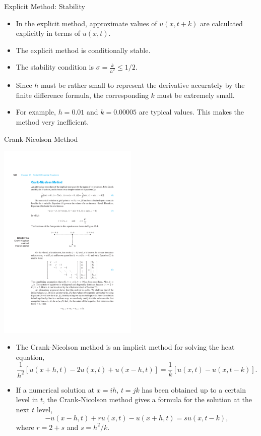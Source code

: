 \documentclass{beamer}
\begin{document}
\begin{frame}{Explicit Method: Stability}
    \begin{itemize}
        \item In the explicit method, approximate values
        of $u(x, t +k)$ are calculated explicitly in terms of $u(x, t)$.
        \item The explicit method is conditionally stable.
        \item The stability condition is $\sigma =\frac{k}{h^2}\leq 1/2$.
        \item Since $h$ must be rather small to represent the derivative accurately by the finite difference
        formula, the corresponding $k$ must be extremely small.
        \item For example, $h=0.01$ and $k=0.00005$ are typical values. This makes the method very inefficient.
    \end{itemize}
\end{frame}
\begin{frame}{Crank-Nicolson Method}
    \centerline{\includegraphics[width=0.5\textwidth]{HeatEqnCN.pdf}}
    \begin{itemize}
        \item The Crank-Nicolson method is an implicit method for solving the heat equation, 
        \[
        \frac{1}{h^2}[u(x+h, t)-2 u(x, t)+u(x-h, t)]=\frac{1}{k}[u(x, t)-u(x, t-k)].
        \]
        \item If a numerical solution at  $x = ih$, $t = jk$ has been obtained up to a certain
        level in $t$, the Crank-Nicolson method gives a formula for the solution at the next $t$ level,
        \[
        -u(x-h,t)+r u(x,t)-u(x+h,t)=s u(x,t-k),
        \] 
        where $r=2+s$ and $s=h^2/k$.
        
    \end{itemize}

\end{frame}
\end{document}
